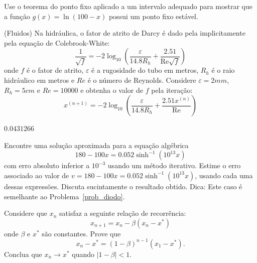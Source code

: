 \begin{ex}
\begin{exer}  Use o teorema do ponto fixo aplicado a um intervalo adequado para mostrar que a função $g(x)=\ln (100-x)$ possui um ponto fixo estável.
\end{exer}

\begin{exer}(Fluidos) Na hidráulica, o fator de atrito de Darcy é dado pela implicitamente pela equação de Colebrook-White:
\begin{equation} \frac{1}{\sqrt{f}}= -2 \log_{10} \left( \frac{\varepsilon}{14.8 R_h} + \frac{2.51}{\mathrm{Re}\sqrt{f}} \right) \end{equation}
onde $f$ é o fator de atrito, $\varepsilon$ é a rugosidade do tubo em metros, $R_{h}$ é o raio hidráulico em metros e ${Re}$ é o número de Reynolds. Considere $\varepsilon=2mm$, $R_{h}=5cm$ e ${Re}=10000$ e obtenha o valor de $f$ pela iteração:
\begin{equation} x^{(n+1)}=-2 \log_{10} \left( \frac{\varepsilon}{14.8 R_{h}} + \frac{2.51x^{(n)}}{\mathrm{Re}} \right) \end{equation}
\end{exer}
\begin{resp}

$0.0431266$

\end{resp}

\begin{exer} Encontre uma solução aproximada para a equação algébrica
\begin{equation} 180-100x=0.052\sinh^{-1}(10^{13}x) \end{equation}
com erro absoluto inferior a $10^{-3}$ usando um método iterativo.
Estime o erro associado ao valor de $v=180-100x=0.052\sinh^{-1}(10^{13}x)$, usando cada uma dessas expressões. Discuta sucintamente o resultado obtido. Dica: Este caso é semelhante ao Problema~\ref{prob_diodo}.
\end{exer}

\begin{exer}Considere que $x_n$ satisfaz a seguinte relação de recorrência:
\begin{equation} x_{n+1}=x_n - \beta \left(x_n-x^*\right) \end{equation}
onde $\beta$ e $x^*$ são constantes.
Prove que \begin{equation} x_n-x^*=(1-\beta)^{n-1}(x_1-x^*). \end{equation}
Conclua que $x_n\to x^*$ quando $|1-\beta|<1$.
\end{exer}


\end{ex}

